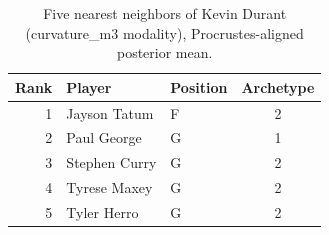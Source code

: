 \begin{table}[htbp]
  \centering\small
  \begin{tabular}{rllc}
    \toprule
    Rank & Player & Position & Archetype \\
    \midrule
    1 & Jayson Tatum & F & 2 \\
    2 & Paul George & G & 1 \\
    3 & Stephen Curry & G & 2 \\
    4 & Tyrese Maxey & G & 2 \\
    5 & Tyler Herro & G & 2 \\
    \bottomrule
  \end{tabular}
  \caption{Five nearest neighbors of Kevin Durant (curvature_m3 modality), Procrustes-aligned posterior mean.}
  \label{tab:Kevin_Durant_neighbors_curvature_m3}
\end{table}

